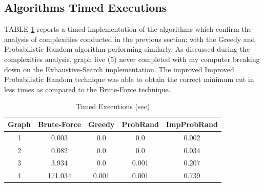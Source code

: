 \documentclass[longpaper, english, final, times]{revdetua}
\begin{document}
		\subsection{Algorithms Timed Executions}
			TABLE \ref{table:algorithmtimedexecutions} reports a timed implementation of the algorithms which confirm the analysis of complexities conducted in the previous section; with the Greedy and Probabilistic Random algorithm performing similarly. As discussed during the complexities analysis, graph five (5) never completed with my computer breaking down on the Exhaustive-Search implementation. The improved Improved Probabilistic Random technique was able to obtain the correct minimum cut in less times as compared to the Brute-Force technique.
			
			\begin{table}[h]
				\caption{Timed Executions (sec)}
				\label{table:algorithmtimedexecutions}
				{\renewcommand{\arraystretch}{2}
					\begin{tabular}{|c|c|c|c|c|}
						\hline
						Graph& Brute-Force & Greedy & ProbRand & ImpProbRand\\
						\hline
						1&0.003&0.0&0.0&0.002\\
						2&0.082&0.0&0.0&0.034\\
						3&3.934&0.0&0.001&0.207\\
						4&171.034&0.001&0.001&0.739\\
						\hline
					\end{tabular}
				}
			\end{table}
			
\end{document}
